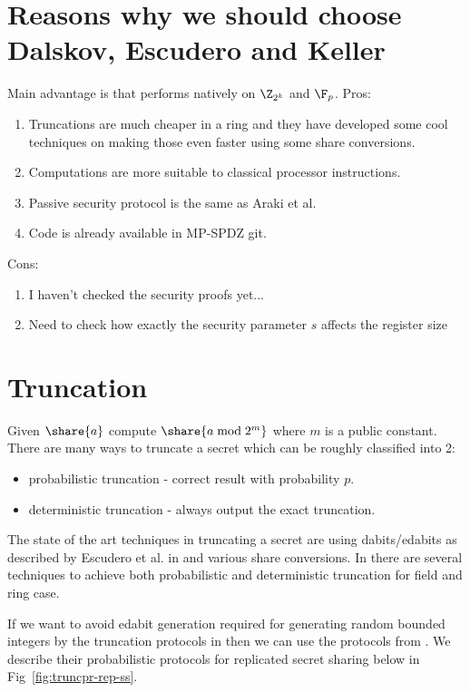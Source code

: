 \section{Reasons why we should choose Dalskov, Escudero and Keller
\cite{cryptoeprint:2020:1330}}

Main advantage is that performs natively on $\Z_{2^k}$ and $\F_p$.
Pros:
\begin{enumerate}
  \item Truncations are much cheaper in a ring and they have developed some
  cool techniques on making those even faster using some share conversions.
  \item Computations are more suitable to classical processor instructions.
  \item Passive security protocol is the same as Araki et al.
  \item Code is already available in MP-SPDZ git.
\end{enumerate}

Cons:
\begin{enumerate}
  \item I haven't checked the security proofs yet...
  \item Need to check how exactly the security parameter $s$ affects the
  register size
\end{enumerate}



\section{Truncation}

Given $\share{a}$ compute $\share{a \bmod 2^m}$ where $m$ is a public constant.
There are many ways to truncate a secret which can be roughly classified into 2:
\begin{itemize}
  \item probabilistic truncation - correct result with probability $p$.
  \item deterministic truncation - always output the exact truncation.
\end{itemize}

\noindent
The state of the art techniques in truncating a secret are using
dabits/edabits as described by Escudero et al. in \cite{C:EGKRS20} and
various share conversions. In \cite{C:EGKRS20} there are several techniques
to achieve both probabilistic and deterministic truncation for field and ring
case.

If we want to avoid edabit generation required for generating random bounded integers
by the truncation protocols in \cite{C:EGKRS20} then we can use the protocols from
\cite{PoPETS:DalEscKel20}. We describe their probabilistic protocols for replicated secret
sharing below in Fig~\ref{fig:truncpr-rep-ss}.

